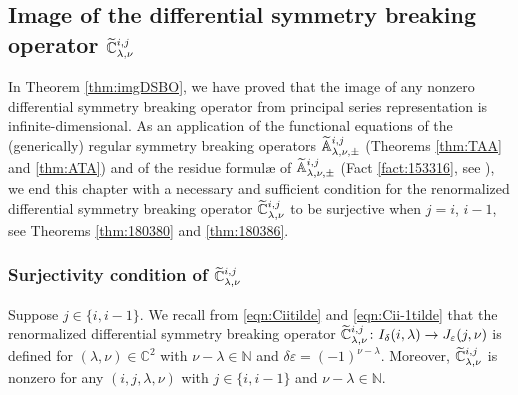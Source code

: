 \subsection{Image of the differential symmetry breaking operator
 $\widetilde{{\mathbb{C}}}_{{\lambda},{\nu}}^{{i,j}}$}
\label{subsec:ImageC}


In Theorem \ref{thm:imgDSBO}, 
 we have proved 
 that the image of any nonzero differential symmetry breaking operator from
 principal series representation
 is infinite-dimensional.  
As an application of the functional equations
 of the (generically) regular symmetry breaking operators
 ${\widetilde{\mathbb{A}}}_{{\lambda},{\nu},{\pm}}^{{i,j}}$
 (Theorems \ref{thm:TAA} and \ref{thm:ATA})
 and of the residue formul{\ae}
 of ${\widetilde{\mathbb{A}}}_{{\lambda},{\nu},{\pm}}^{{i,j}}$
 (Fact \ref{fact:153316},  see \cite{xkresidue}), 
 we end this chapter
 with a necessary and sufficient condition
 for the renormalized differential symmetry breaking operator
 $\widetilde{{\mathbb{C}}}_{{\lambda},{\nu}}^{{i,j}}$ to be surjective
 when $j=i$, $i-1$, 
see Theorems \ref{thm:180380} and \ref{thm:180386}.  


\subsubsection{Surjectivity condition of $\widetilde{{\mathbb{C}}}_{{\lambda},{\nu}}^{{i,j}}$}
Suppose $j \in \{i,i-1\}$.  
We recall from \eqref{eqn:Ciitilde} and \eqref{eqn:Cii-1tilde}
 that the renormalized differential symmetry 
 breaking operator 
$\widetilde{{\mathbb{C}}}_{{\lambda},{\nu}}^{{i,j}}\colon I_{\delta}(i,\lambda)
 \to J_{\varepsilon}(j,\nu)$
 is defined 
 for $(\lambda, \nu) \in {\mathbb{C}}^2$
 with $\nu-\lambda \in {\mathbb{N}}$
 and $\delta \varepsilon =(-1)^{\nu-\lambda}$.  
Moreover, 
 $\widetilde{{\mathbb{C}}}_{{\lambda},{\nu}}^{{i,j}}$ is nonzero
 for any $(i,j, \lambda,\nu)$
 with $j \in \{i,i-1\}$
 and $\nu-\lambda \in {\mathbb{N}}$.  



